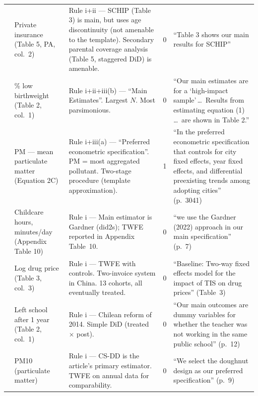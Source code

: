 \begin{small}
\begin{longtable}{p{2.2cm} p{3.0cm} p{5.5cm} p{0.8cm} p{4cm}}
\textcite{levine2011effective}
& Private insurance (Table 5, PA, col.~2)
& Rule i+ii --- SCHIP (Table 3) is main, but uses age discontinuity (not amenable to the template). Secondary parental coverage analysis (Table 5, staggered DiD) is amenable.
& 0
& ``Table 3 shows our main results for SCHIP'' \\

\textcite{hoynes2015income}
& \% low birthweight (Table 2, col.~1)
& Rule i+ii+iii(b) --- ``Main Estimates''. Largest $N$. Most parsimonious.
& 0
& ``Our main estimates are for a `high-impact sample'\,\ldots\, Results from estimating equation (1) \ldots\ are shown in Table 2.'' \\

\textcite{greenstone2014environmental}
& PM --- mean particulate matter (Equation 2C)
& Rule i+iii(a) --- ``Preferred econometric specification''. PM = most aggregated pollutant. Two-stage procedure (template approximation).
& 1
& ``In the preferred econometric specification that controls for city fixed effects, year fixed effects, and differential preexisting trends among adopting cities'' (p.~3041) \\


\textcite{maclean2025paid}
& Childcare hours, minutes/day (Appendix Table 10)
& Rule i --- Main estimator is Gardner (did2s); TWFE reported in Appendix Table~10.
& 0
& ``we use the Gardner (2022) approach in our main specification'' (p.~7) \\

\textcite{li2025shortened}
& Log drug price (Table 3, col.~3)
& Rule i --- TWFE with controls. Two-invoice system in China. 13 cohorts, all eventually treated.
& 0
& ``Baseline: Two-way fixed effects model for the impact of TIS on drug prices'' (Table~3) \\

\textcite{estrada2024dismissal}
& Left school after 1 year (Table 2, col.~1)
& Rule i --- Chilean reform of 2014. Simple DiD (treated $\times$ post).
& 0
& ``Our main outcomes are dummy variables for whether the teacher was not working in the same public school'' (p.~12) \\

\textcite{sarmiento2023air}
& PM10 (particulate matter)
& Rule i --- CS-DD is the article's primary estimator. TWFE on annual data for comparability.
& 0
& ``We select the doughnut design as our preferred specification'' (p.~9) \\


\end{longtable}
\end{small}
